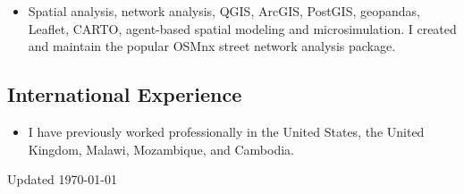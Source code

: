 \documentclass{academiccv}
\begin{document}
\begin{itemize}

\item Spatial analysis, network analysis, QGIS, ArcGIS, PostGIS, geopandas, Leaflet, CARTO, agent-based spatial modeling and microsimulation. I created and maintain the popular OSMnx street network analysis package.

\end{itemize}

\subsection*{International Experience}

\begin{itemize}
	
\item I have previously worked professionally in the United States, the United Kingdom, Malawi, Mozambique, and Cambodia.

\end{itemize}



\begin{center}
\vspace{6em}
Updated \monthyeardate\today
\end{center}
\end{document}
